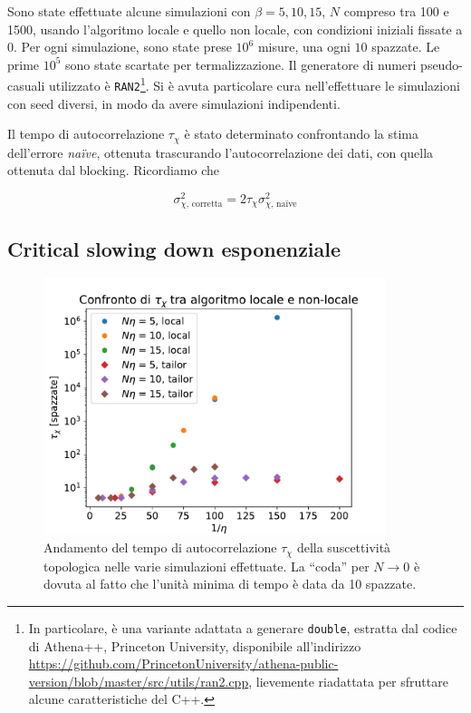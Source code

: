 \documentclass[a4paper,11pt]{article}
\newcommand{\code}[1]{\texttt{#1}}
\begin{document}
    Sono state effettuate alcune simulazioni con $\beta = 5, 10, 15$, $N$ compreso tra 100 e 1500, usando l'algoritmo locale e quello non locale, con condizioni iniziali fissate a 0. Per ogni simulazione, sono state prese $10^6$ misure, una ogni $10$ spazzate. Le prime $10^5$ sono state scartate per termalizzazione. Il generatore di numeri pseudo-casuali utilizzato è \code{RAN2}\footnote{In particolare, è una variante adattata a generare \code{double}, estratta dal codice di Athena++, Princeton University, disponibile all'indirizzo \url{https://github.com/PrincetonUniversity/athena-public-version/blob/master/src/utils/ran2.cpp}, lievemente riadattata per sfruttare alcune caratteristiche del C++.}. Si è avuta particolare cura nell'effettuare le simulazioni con seed diversi, in modo da avere simulazioni indipendenti.
    
    Il tempo di autocorrelazione $\tau_\chi$ è stato determinato confrontando la stima dell'errore \emph{naïve}, ottenuta trascurando l'autocorrelazione dei dati, con quella ottenuta dal blocking. Ricordiamo che
    
    \begin{equation}
        \sigma^2_{\chi \text{, corretta}} = 2 \tau_\chi \sigma^2_{\chi \text{, naïve}}
    \end{equation}

    
    \subsection{Critical slowing down esponenziale}
    
    \begin{figure}[hptb]
        \centering
        \includegraphics[width=10cm]{figure/csd_autocorr.pdf}
        \caption{Andamento del tempo di autocorrelazione $\tau_\chi$ della suscettività topologica nelle varie simulazioni effettuate. La ``coda'' per $N \to 0$ è dovuta al fatto che l'unità minima di tempo è data da 10 spazzate.}
        \label{fig:csd_autocorr}
    \end{figure}
\end{document}
